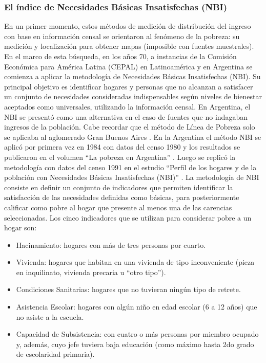 \subsubsection{El índice de Necesidades Básicas Insatisfechas (NBI)}

En un primer momento, estos métodos de medición de distribución del ingreso con base en información censal se orientaron al fenómeno de la pobreza: su medición y localización para obtener mapas (imposible con fuentes muestrales). En el marco de esta búsqueda, en los años 70, a instancias de la Comisión Económica para América Latina (CEPAL) en Latinoamérica y en Argentina se comienza a aplicar la metodología de Necesidades Básicas Insatisfechas (NBI). Su principal objetivo es identificar hogares y personas que no alcanzan a satisfacer un conjunto de necesidades consideradas indispensables según niveles de bienestar aceptados como universales, utilizando la información censal. 
En Argentina, el NBI se presentó como una alternativa en el caso de fuentes que no indagaban ingresos de la población. Cabe recordar que el método de Línea de Pobreza solo se aplicaba al aglomerado Gran Buenos Aires \cite{indec1984}. En la Argentina el método NBI se aplicó por primera vez en 1984 con datos del censo 1980 y los resultados se publicaron en el volumen “La pobreza en Argentina” \cite{indec1984}. Luego se replicó la metodología con datos del censo 1991 en el estudio “Perfil de los hogares y de la población con Necesidades Básicas Insatisfechas (NBI)” \cite{indec1996}.
La metodología de NBI \cite{beccaria,indec2000a,indec2000b} consiste en definir un conjunto de indicadores que permiten identificar la satisfacción de las necesidades definidas como básicas, para posteriormente calificar como pobre al hogar que presente al menos una de las carencias seleccionadas. Los cinco indicadores que se utilizan para considerar pobre a un hogar son:

\begin{itemize}
	\item Hacinamiento: hogares con más de tres personas por cuarto.
	\item Vivienda: hogares que habitan en una vivienda de tipo inconveniente (pieza en inquilinato, vivienda precaria u “otro tipo”).
	\item Condiciones Sanitarias: hogares que no tuvieran ningún tipo de retrete.
	\item Asistencia Escolar: hogares con algún niño en edad escolar (6 a 12 años) que no asiste a la escuela.
	\item Capacidad de Subsistencia: con cuatro o más personas por miembro ocupado y, además, cuyo jefe tuviera baja educación (como máximo hasta 2do grado de escolaridad primaria).
\end{itemize}

